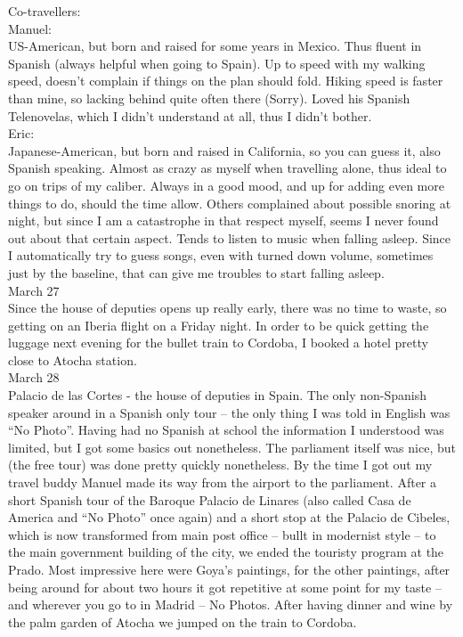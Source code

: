 Co-travellers: \\
Manuel:\\
US-American, but born and raised for some years in Mexico. Thus fluent in Spanish (always helpful when going to Spain). Up to speed with my walking speed, doesn't complain if things on the plan should fold. Hiking speed is faster than mine, so lacking behind quite often there (Sorry). Loved his Spanish Telenovelas, which I didn't understand at all, thus I didn't bother. \\

Eric:\\
Japanese-American, but born and raised in California, so you can guess it, also Spanish speaking. Almost as crazy as myself when travelling alone, thus ideal to go on trips of my caliber. Always in a good mood, and up for adding even more things to do, should the time allow. Others complained about possible snoring at night, but since I am a catastrophe in that respect myself, seems I never found out about that certain aspect. Tends to listen to music when falling asleep. Since I automatically try to guess songs, even with turned down volume, sometimes just by the baseline, that can give me troubles to start falling asleep. \\

March 27\\
Since the house of deputies opens up really early, there was no time to waste, so getting on an Iberia flight on a Friday night. In order to be quick getting the luggage next evening for the bullet train to Cordoba, I booked a hotel pretty close to Atocha station.\\

March 28\\
Palacio de las Cortes - the house of deputies in Spain. The only non-Spanish speaker around in a Spanish only tour -- the only thing I was told in English was ``No Photo''. Having had no Spanish at school the information I understood was limited, but I got some basics out nonetheless. The parliament itself was nice, but (the free tour) was done pretty quickly nonetheless. By the time I got out my travel buddy Manuel made its way from the airport to the parliament. After a short Spanish tour of the Baroque Palacio de Linares (also called Casa de America and ``No Photo'' once again) and a short stop at the Palacio de Cibeles, which is now transformed from main post office -- bullt in modernist style -- to the main government building of the city, we ended the touristy program at the Prado. Most impressive here were Goya's paintings, for the other paintings, after being around for about two hours it got repetitive at some point for my taste -- and wherever you go to in Madrid -- No Photos. After having dinner and wine by the palm garden of Atocha we jumped on the train to Cordoba.\\

